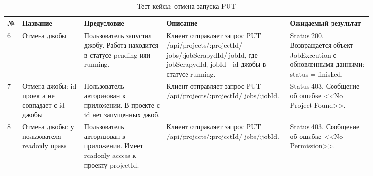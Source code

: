 \documentclass[a4paper,12pt]{article}
\begin{document}
	\begin{table}[hbt]
		\centering
		\begin{tabular}{|p{0.02\linewidth}|p{0.15\linewidth}|p{0.2\linewidth}|p{0.3\linewidth}|p{0.2\linewidth}|} 
			\hline
			\textbf{№} & \textbf{Название} & \textbf{Предусловие} & \textbf{Описание} & \textbf{Ожидаемый результат} \\ \hline
	6 & Отмена джобы & Пользователь запустил джобу. Работа находится в статусе pending или running. & Клиент отправляет запрос PUT      /api/projects/:projectId/ jobs/:jobScrapydId/:jobId, где jobScrapydId, jobId - id джобы в статусе running. & Status 200. Возвращается объект JobExecution с обновленными данными: status = finished. \\ \hline
	
	7 & Отмена джобы: id проекта не совпадает с id джобы & Пользователь авторизован в приложении. В проекте с id нет запущенных джоб. & Клиент отправляет запрос PUT      /api/projects/:projectId/ jobs/:jobId. & Status 403. Сообщение об ошибке <<No Project Found>>. \\ \hline
	
	8 &  Отмена джобы: у пользователя readonly права & Пользователь авторизован в приложении. Имеет readonly access к проекту projectId. & Клиент отправляет запрос PUT      /api/projects/:projectId/ jobs/:jobId. & Status 403. Сообщение об ошибке <<No Permission>>. \\ \hline
	
	\end{tabular}
	\caption{Тест кейсы: отмена запуска PUT}
	\end{table} 
	
\end{document}
